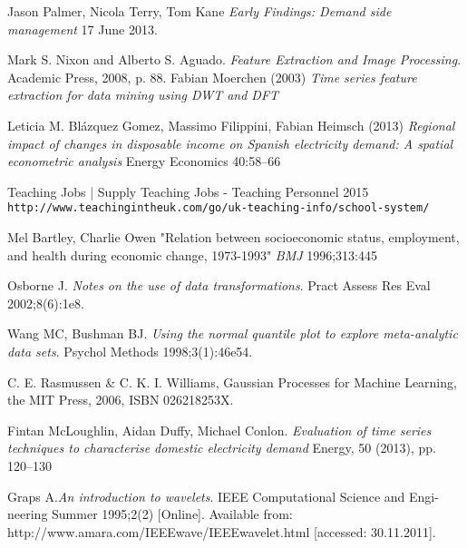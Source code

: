 \documentclass[12pt,a4paper]{report}
\begin{document}
\begin{thebibliography}{9}
Jason Palmer, Nicola Terry, Tom Kane \textit{Early Findings: Demand side management} 17 June 2013.

Mark S. Nixon and Alberto S. Aguado. \textit{Feature Extraction and Image Processing}. Academic Press, 2008, p. 88.
 Fabian Moerchen (2003) \textit{Time series feature extraction for data mining using DWT and DFT}

 Leticia M. Blázquez Gomez, Massimo Filippini, Fabian Heimsch (2013) \textit{Regional impact of changes in disposable income on Spanish electricity demand: A spatial econometric analysis} Energy Economics 40:58–66

 Teaching Jobs | Supply Teaching Jobs - Teaching Personnel 2015 \texttt{http://www.teachingintheuk.com/go/uk-teaching-info/school-system/}

 Mel Bartley, Charlie Owen "Relation between socioeconomic status, employment, and health during economic change, 1973-1993" \textit{BMJ} 1996;313:445

 Osborne J. \textit{Notes on the use of data transformations}. Pract Assess Res Eval 2002;8(6):1e8.

 Wang MC, Bushman BJ. \textit{Using the normal quantile plot to explore meta-analytic data sets}. Psychol Methods 1998;3(1):46e54.

 C. E. Rasmussen \& C. K. I. Williams, Gaussian Processes for Machine Learning, the MIT Press, 2006,
ISBN 026218253X.

 Fintan McLoughlin, Aidan Duffy, Michael Conlon. \textit{Evaluation of time series techniques to characterise domestic electricity demand} Energy, 50 (2013), pp. 120–130

 Graps A.\textit{An introduction to wavelets}. IEEE Computational Science and Engi-neering Summer 1995;2(2) [Online]. Available from: http://www.amara.com/IEEEwave/IEEEwavelet.html [accessed: 30.11.2011].

\end{thebibliography}
\end{document}
